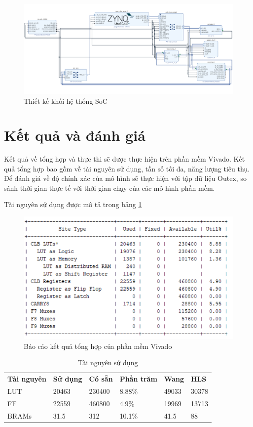 \begin{figure}[!ht]
	\centering
	\includegraphics[width=\linewidth]{figures/socreal.png}
	\caption{Thiết kế khối hệ thống SoC}
	\label{fig:socreal}
\end{figure}
\section{Kết quả và đánh giá}
Kết quả về tổng hợp và thực thi sẽ được thực hiện trên phần mềm Vivado. Kết quả tổng hợp bao gồm về tài nguyên sử dụng, tần số tối đa, năng lượng tiêu thụ. Để đánh giá về độ chính xác của mô hình sẽ thực hiện với tập dữ liệu Outex, so sánh thời gian thực tế với thời gian chạy của các mô hình phần mềm.

Tài nguyên sử dụng được mô tả trong bảng \ref{tab:resource}
\begin{figure}[!ht]
	\centering
	\includegraphics[width=\linewidth]{figures/synthesis_report.png}
	\caption{Báo cáo kết quả tổng hợp của phần mềm Vivado}
	\label{fig:synthesis_report}
\end{figure}
\begin{table}[H]
	\centering
	\renewcommand{\arraystretch}{1.3}
		\caption{Tài nguyên sử dụng}
	\begin{tabular}{|p{2cm} p{2cm} p{2cm} p{2cm} p{2cm} p{2cm}|}
		\hline
		\rowcolor{gray!30}
		\textbf{Tài nguyên} & \textbf{Sử dụng}  & \textbf{Có sẵn} & \textbf{Phần trăm} &  \textbf{Wang \cite{realTimeTexture}} & \textbf{HLS}  \\
		LUT & 20463 & 230400 & 8.88\% & 49033 & 30378
		\\ \hline
		FF & 22559 & 460800 & 4.9\% & 19969 & 13713
		\\ \hline
		BRAMs & 31.5 & 312 & 10.1\% & 41.5 & 88
		\\ \hline
	\end{tabular}

	\label{tab:resource}
\end{table}


